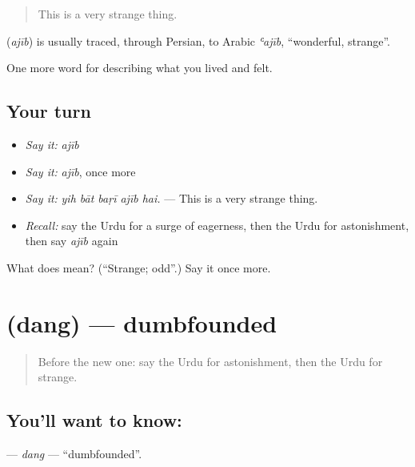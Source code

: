 \begin{quote}
This is a very strange thing.
\end{quote}

\begin{cousinweb}
\textbf{} (\emph{ajīb}) is usually traced, through Persian, to Arabic \emph{ʿajīb}, \textquotedblleft{}wonderful, strange\textquotedblright{}.
\end{cousinweb}

\begin{grammarlens}[title={What you've built}]
One more word for describing what you lived and felt.
\end{grammarlens}

\subsection*{Your turn}
\begin{itemize}
\raggedright
  \item \emph{Say it:} \emph{ajīb}
  \item \emph{Say it:} \emph{ajīb}, once more
  \item \emph{Say it:} \emph{yih bāt baṛī ajīb hai.} — This is a very strange thing.
  \item \emph{Recall:} say the Urdu for a surge of eagerness, then the Urdu for astonishment, then say \emph{ajīb} again
\end{itemize}

\begin{tcolorbox}[breakable,colback=teal!4,colframe=teal!35!black,title={Before you move on}]
What does  mean? (\textquotedblleft{}Strange; odd\textquotedblright{}.) Say it once more.
\end{tcolorbox}
\section[\texorpdfstring{\ur{دنگ} (dang)}{دنگ (dang)}]{ (dang) — dumbfounded}

\label{lesson:UR-C442-dang}



\begin{quote}
Before the new one: say the Urdu for astonishment, then the Urdu for strange.
\end{quote}

\subsection*{You'll want to know: }
\textbf{} — \emph{dang} — \textquotedblleft{}dumbfounded\textquotedblright{}.

